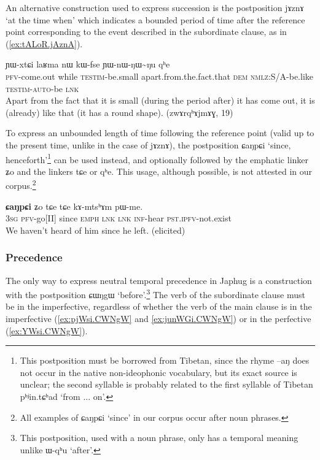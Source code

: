 \documentclass[oldfontcommands,oneside,a4paper,11pt]{article}
\newcommand{\ipa}[1]{{\phon \mbox{#1}}} %
\newcommand{\refb}[1]{(\ref{#1})}
\begin{document}
An alternative construction used to express succession is the postposition \ipa{jɤznɤ} `at the time when' which indicates a bounded period of time after the reference point corresponding to the event described in the subordinate clause, as in \refb{ex:tALoR.jAznA}.

\begin{exe}
\ex \label{ex:tALoR.jAznA}
\gll 
[\ipa{tɤ-ɬoʁ}]  	\ipa{\textbf{jɤznɤ}}  	\ipa{ɲɯ-xtɕi}  	\ipa{laʁma}  	\ipa{nɯ}  	\ipa{kɯ-fse}  	\ipa{ɲɯ-nɯ-ŋɯ\textasciitilde{}ŋu}  	\ipa{qʰe}  \\
\textsc{pfv}-come.out  while \textsc{testim}-be.small apart.from.the.fact.that \textsc{dem} \textsc{nmlz}:S/A-be.like \textsc{testim-auto}-be \textsc{lnk} \\
\glt Apart from the fact that it is small (during the period after) it has come out, it is (already) like that (it has a round shape). (\ipa{zwɤrqʰɤjmɤɣ}, 19)
	\end{exe}


 To express an unbounded length of time following the reference point (valid up to the present time, unlike in the case of \ipa{jɤznɤ}), the postposition \ipa{ɕaŋpɕi} `since, henceforth'\footnote{This postposition must be borrowed from Tibetan, since the rhyme \ipa{--aŋ} does not occur in the native non-ideophonic vocabulary, but its exact source is unclear; the second syllable is probably related to the first syllable of Tibetan \ipa{pʰʲin.tɕʰad} `from ... on'.} can be used instead, and optionally followed by the emphatic linker \ipa{ʑo} and the linkers \ipa{tɕe} or \ipa{qʰe}. This usage, although possible, is not attested in our corpus.\footnote{All examples of \ipa{ɕaŋpɕi} `since' in our corpus occur after noun phrases.}
  \begin{exe}
\ex \label{ex:jariCaNpCi} 
\gll
 [\ipa{ɯʑo}   	\ipa{jɤ-ari}]   	\textbf{\ipa{ɕaŋpɕi}}   	\ipa{ʑo}   	\ipa{tɕe}   	\ipa{tɕe}   	\ipa{kɤ-mtsʰɤm}   	\ipa{pɯ-me.}   	\\
\textsc{3sg} \textsc{pfv}-go[II] since \textsc{emph} \textsc{lnk}  \textsc{lnk} \textsc{inf}-hear \textsc{pst.ipfv}-not.exist \\
 \glt We haven't heard of him since he left. (elicited)
\end{exe}
 


\subsubsection{Precedence} \label{sec:precedence}
The only way to express neutral temporal precedence  in Japhug  is a construction with the postposition  \ipa{ɕɯŋgɯ} `before'.\footnote{This postposition, used with a noun phrase, only has a temporal meaning unlike \ipa{ɯ-qʰu} `after'.} The verb of the subordinate clause must be in the imperfective, regardless of whether the verb of the main clause is in the imperfective  (\ref{ex:pjWsi.CWNgW} and \ref{ex:junWGi.CWNgW}) or in the perfective   \refb{ex:YWsi.CWNgW}.
\end{document}
